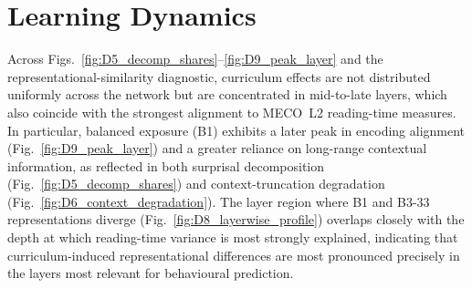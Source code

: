 \newpage
\clearpage 

\section{Learning Dynamics}\label{sec:appx-dynamics}

Across Figs.~\ref{fig:D5_decomp_shares}--\ref{fig:D9_peak_layer} and the representational-similarity diagnostic, curriculum effects are not distributed uniformly across the network but are concentrated in mid-to-late layers, which also coincide with the strongest alignment to MECO~L2 reading-time measures. In particular, balanced exposure (B1) exhibits a later peak in encoding alignment (Fig.~\ref{fig:D9_peak_layer}) and a greater reliance on long-range contextual information, as reflected in both surprisal decomposition (Fig.~\ref{fig:D5_decomp_shares}) and context-truncation degradation (Fig.~\ref{fig:D6_context_degradation}). The layer region where B1 and B3-33 representations diverge (Fig.~\ref{fig:D8_layerwise_profile}) overlaps closely with the depth at which reading-time variance is most strongly explained, indicating that curriculum-induced representational differences are most pronounced precisely in the layers most relevant for behavioural prediction.

